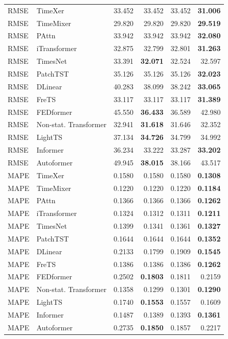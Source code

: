 \begin{longtable}{llrrrr}
\midrule
RMSE & TimeXer & 33.452 & 33.452 & 33.452 & \textbf{31.006} \\
RMSE & TimeMixer & 29.820 & 29.820 & 29.820 & \textbf{29.519} \\
RMSE & PAttn & 33.942 & 33.942 & 33.942 & \textbf{32.080} \\
RMSE & iTransformer & 32.875 & 32.799 & 32.801 & \textbf{31.263} \\
RMSE & TimesNet & 33.391 & \textbf{32.071} & 32.524 & 32.597 \\
RMSE & PatchTST & 35.126 & 35.126 & 35.126 & \textbf{32.023} \\
RMSE & DLinear & 40.283 & 38.099 & 38.242 & \textbf{33.065} \\
RMSE & FreTS & 33.117 & 33.117 & 33.117 & \textbf{31.389} \\
RMSE & FEDformer & 45.550 & \textbf{36.433} & 36.589 & 42.980 \\
RMSE & Non-stat. Transformer & 32.941 & \textbf{31.618} & 31.646 & 32.352 \\
RMSE & LightTS & 37.134 & \textbf{34.726} & 34.799 & 34.992 \\
RMSE & Informer & 36.234 & 33.222 & 33.287 & \textbf{33.202} \\
RMSE & Autoformer & 49.945 & \textbf{38.015} & 38.166 & 43.517 \\
\midrule
MAPE & TimeXer & 0.1580 & 0.1580 & 0.1580 & \textbf{0.1308} \\
MAPE & TimeMixer & 0.1220 & 0.1220 & 0.1220 & \textbf{0.1184} \\
MAPE & PAttn & 0.1366 & 0.1366 & 0.1366 & \textbf{0.1262} \\
MAPE & iTransformer & 0.1324 & 0.1312 & 0.1311 & \textbf{0.1211} \\
MAPE & TimesNet & 0.1399 & 0.1341 & 0.1361 & \textbf{0.1327} \\
MAPE & PatchTST & 0.1644 & 0.1644 & 0.1644 & \textbf{0.1352} \\
MAPE & DLinear & 0.2133 & 0.1799 & 0.1909 & \textbf{0.1545} \\
MAPE & FreTS & 0.1386 & 0.1386 & 0.1386 & \textbf{0.1262} \\
MAPE & FEDformer & 0.2502 & \textbf{0.1803} & 0.1811 & 0.2159 \\
MAPE & Non-stat. Transformer & 0.1358 & 0.1299 & 0.1301 & \textbf{0.1290} \\
MAPE & LightTS & 0.1740 & \textbf{0.1553} & 0.1557 & 0.1609 \\
MAPE & Informer & 0.1487 & 0.1389 & 0.1393 & \textbf{0.1361} \\
MAPE & Autoformer & 0.2735 & \textbf{0.1850} & 0.1857 & 0.2217 \\
\end{longtable}
\endgroup

